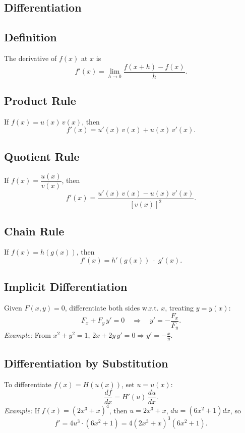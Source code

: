 \documentclass{article}
\begin{document}
\begin{multicols}{2}

\section*{Differentiation}

\subsection*{Definition}
The derivative of $f(x)$ at $x$ is
\[
f'(x) = \lim_{h\to 0}\frac{f(x+h)-f(x)}{h}.
\]

\subsection*{Product Rule}
If $f(x)=u(x)\,v(x)$, then
\[
f'(x)=u'(x)\,v(x)+u(x)\,v'(x).
\]

\subsection*{Quotient Rule}
If $f(x)=\dfrac{u(x)}{v(x)}$, then
\[
f'(x)=\frac{u'(x)\,v(x)-u(x)\,v'(x)}{[v(x)]^2}.
\]

\subsection*{Chain Rule}
If $f(x)=h(g(x))$, then
\[
f'(x)=h'(g(x))\;\cdot\;g'(x).
\]

\subsection*{Implicit Differentiation}
Given $F(x,y)=0$, differentiate both sides w.r.t. $x$, treating $y=y(x)$:
\[
F_x + F_y\,y'=0
\quad\Longrightarrow\quad
y'=-\frac{F_x}{F_y}.
\]
\emph{Example:} From $x^2+y^2=1$, $2x+2y\,y'=0\Rightarrow y'=-\tfrac{x}{y}.$

\subsection*{Differentiation by Substitution}
To differentiate $f(x)=H(u(x))$, set $u=u(x)$:
\[
\frac{df}{dx}=H'(u)\,\frac{du}{dx}.
\]
\emph{Example:} If $f(x)=(2x^3+x)^4$, then $u=2x^3+x$, $du= (6x^2+1) dx$, so
\[
f' = 4u^3 \cdot (6x^2+1) = 4(2x^3 + x)^3(6x^2+1).
\]

\columnbreak


\end{multicols}
\end{document}
